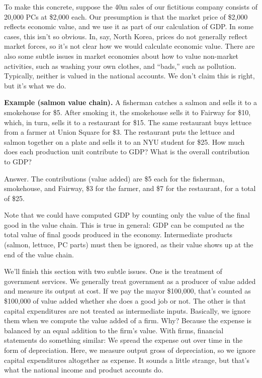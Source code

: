 To make this concrete, suppose the 40m sales of
our fictitious company consists of 20,000 PCs at \$2,000 each. Our
presumption is that the market price of \$2,000 reflects economic
value, and we use it as part of our calculation of GDP. In some
cases, this isn't so obvious. In, say, North Korea, prices do not
generally reflect market forces, so it's not clear how we would calculate
economic value.
There are also some subtle issues in market economies
about how to value non-market activities, such as
washing your own clothes, and ``bads,'' such as pollution.
Typically, neither is valued in the national accounts.
We don't claim this is right, but it's what we do.

\textbf{Example (salmon value chain).} A fisherman catches a salmon
and sells it to a smokehouse for \$5. After smoking it, the
smokehouse sells it to Fairway for \$10, which, in turn,
sells it to a restaurant for \$15. The same restaurant buys
lettuce from a farmer at Union Square for \$3. The restaurant puts
the lettuce and salmon together on a plate and sells it to an NYU
student for \$25. How much does each production unit contribute to
GDP? What is the overall contribution to GDP?

Answer. The contributions (value added) are \$5 each for the
fisherman, smokehouse, and Fairway, \$3 for the farmer, and
\$7 for the restaurant, for a total of \$25.

Note that we could have computed GDP by counting only the value of the final good
in the value chain. This is true in general: GDP can be
computed as the total   value of final goods 
 produced in the economy. Intermediate products (salmon, lettuce, PC parts) must
then be ignored, as their value shows up at the end of the value
chain.

We'll finish this section with two subtle issues.
One is the treatment of government services.
We generally treat government as a producer of value added
and measure its output at cost.
If we pay the mayor \$100,000, that's counted as \$100,000
of value added whether she does a good job or not.
The other is that capital expenditures are not treated as
intermediate inputs.
Basically, we ignore them when we compute the value added of a firm.
Why? Because the expense is balanced
by an equal addition to the firm's value.
With firms, financial statements do something similar:
We spread the expense out over time in the form of depreciation.
Here, we measure output gross of depreciation, so we ignore
capital expenditures altogether as expense.
It sounds a little strange, but that's what the national income
and product accounts do.


